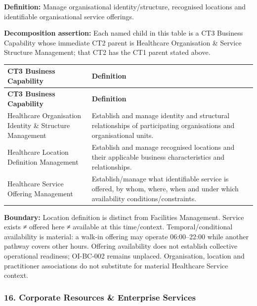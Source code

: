\textbf{Definition:} Manage organisational identity/\allowbreak{}structure, recognised locations and identifiable organisational service offerings.

\label{rad:business:938}

\textbf{Decomposition assertion:} Each named child in this table is a CT3 Business Capability whose immediate CT2 parent is Healthcare Organisation \& Service Structure Management; that CT2 has the CT1 parent stated above.

\label{rad:business:940}
\begingroup\small\setlength{\TableWidth}{\dimexpr\linewidth-4\tabcolsep-3\arrayrulewidth\relax}
\begin{longtable}{|>{\raggedright\arraybackslash}p{0.35\TableWidth}|>{\raggedright\arraybackslash}p{0.65\TableWidth}|}
\hline\rowcolor{TableHead}\textbf{CT3 Business Capability} & \textbf{Definition}\\\hline\endfirsthead
\hline\rowcolor{TableHead}\textbf{CT3 Business Capability} & \textbf{Definition}\\\hline\endhead
\hline\endfoot
Healthcare Organisation Identity \& Structure Management & Establish and manage identity and structural relationships of participating organisations and organisational units.\\\hline
Healthcare Location Definition Management & Establish and manage recognised locations and their applicable business characteristics and relationships.\\\hline
Healthcare Service Offering Management & Establish/\allowbreak{}manage what identifiable service is offered, by whom, where, when and under which availability conditions/\allowbreak{}constraints.\\\hline
\end{longtable}\endgroup
{}\label{rad:business:946}

\textbf{Boundary:} Location definition is distinct from Facilities Management. Service exists ≠ offered here ≠ available at this time/\allowbreak{}context. Temporal/\allowbreak{}conditional availability is material: a walk-in offering may operate 06:00–22:00 while another pathway covers other hours. Offering availability does not establish collective operational readiness; OI-BC-002 remains unplaced. Organisation, location and practitioner associations do not substitute for material Healthcare Service context.

\label{rad:business:948}
\subsubsection*{16. Corporate Resources \& Enterprise Services}
\label{rad:business:950}

